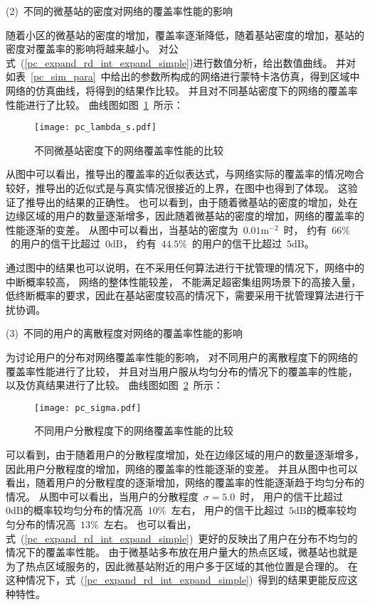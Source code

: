 (2)~不同的微基站的密度对网络的覆盖率性能的影响

随着小区的微基站的密度的增加，覆盖率逐渐降低，随着基站密度的增加，基站的密度对覆盖率的影响将越来越小。
对公式~(\ref{pc_expand_rd_int_expand_simple})进行数值分析，给出数值曲线。
并对如表~\ref{pc_sim_para}~中给出的参数所构成的网络进行蒙特卡洛仿真，得到区域中网络的仿真曲线，将得到的结果作比较。
并且对不同基站密度下的网络的覆盖率性能进行了比较。
曲线图如图~\ref{pc_lambda_s_graph}~所示：
\begin{figure}[htbp]
\centering
\texttt{[image: pc\_lambda\_s.pdf]}
\caption{不同微基站密度下的网络覆盖率性能的比较}\vspace{-0.5em}
\label{pc_lambda_s_graph}
\end{figure}
从图中可以看出，推导出的覆盖率的近似表达式，与网络实际的覆盖率的情况吻合较好，推导出的近似式是与真实情况很接近的上界，在图中也得到了体现。
这验证了推导出的结果的正确性。
也可以看到，由于随着微基站的密度的增加，处在边缘区域的用户的数量逐渐增多，因此随着微基站的密度的增加，网络的覆盖率的性能逐渐的变差。
从图中可以看出，当基站的密度为~$0.01\mathrm{m}^{-2}$~时，
约有~$66\%$~的用户的信干比超过~$0\mathrm{dB}$，
约有~$44.5\%$~的用户的信干比超过~$5\mathrm{dB}$。

通过图中的结果也可以说明，在不采用任何算法进行干扰管理的情况下，网络中的中断概率较高，
网络的整体性能较差，
不能满足超密集组网场景下的高接入量，低终断概率的要求，因此在基站密度较高的情况下，需要采用干扰管理算法进行干扰协调。

(3)~不同的用户的离散程度对网络的覆盖率性能的影响

为讨论用户的分布对网络覆盖率性能的影响，
对不同用户的离散程度下的网络的覆盖率性能进行了比较， 并且对当用户服从均匀分布的情况下的覆盖率的性能，以及仿真结果进行了比较。
曲线图如图~\ref{pc_sigma_graph}~所示：
\begin{figure}[htbp]
\centering
\texttt{[image: pc\_sigma.pdf]}
\caption{不同用户分散程度下的网络覆盖率性能的比较}\vspace{-0.5em}
\label{pc_sigma_graph}
\end{figure}

可以看到，由于随着用户的分散程度增加，处在边缘区域的用户的数量逐渐增多，因此用户分散程度的增加，网络的覆盖率的性能逐渐的变差。
并且从图中也可以看出，随着用户的分散程度的逐渐增加，网络的覆盖率的性能逐渐趋于均匀分布的情况。
从图中可以看出，当用户的分散程度~$\sigma=5.0$~时，
用户的信干比超过~$0\mathrm{dB}$的概率较均匀分布的情况高~$10\%$~左右，
用户的信干比超过~$5\mathrm{dB}$的概率较均匀分布的情况高~$13\%$~左右。
也可以看出，式~(\ref{pc_expand_rd_int_expand_simple})~更好的反映出了用户在分布不均匀的情况下的覆盖率性能。
由于微基站多布放在用户量大的热点区域，微基站也就是为了热点区域服务的，因此微基站附近的用户多于区域的其他位置是合理的。
在这种情况下，式~(\ref{pc_expand_rd_int_expand_simple})~得到的结果更能反应这种特性。


